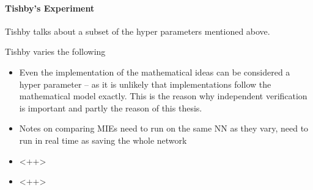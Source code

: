 \documentclass[dissertation.tex]{subfiles}
\begin{document}
\paragraph{Tishby's Experiment} 

Tishby\cite{TISBHY} talks about a subset of the hyper parameters mentioned
above. 

Tishby varies the following 
\begin{itemize}
  \item{
      Even the implementation of the mathematical ideas can be considered a
      hyper parameter -- as it is unlikely that implementations follow the
      mathematical model exactly. This is the reason why independent
      verification is important and partly the reason of this thesis.
    }
  \item{
      Notes on comparing MIEs need to run on the same NN as they vary, need to
      run in real time as saving the whole network
    }
  \item{
      <++>
    }
  \item{
      <++>
    }
\end{itemize}
\end{document}
